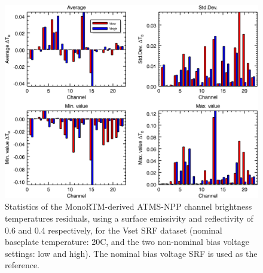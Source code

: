\begin{figure}[H]
  \centering
    \includegraphics[bb=0 0 416 333,clip,scale=0.9]{graphics/dtb/Vset/e0.6_r0.4/stats_ref-nominal.png} 
  \caption{Statistics of the MonoRTM-derived ATMS-NPP channel brightness temperatures residuals, using a surface emissivity and reflectivity of 0.6 and 0.4 respectively, for the Vset SRF dataset (nominal baseplate temperature: 20\textdegree{}C, and the two non-nominal bias voltage settings: low and high). The nominal bias voltage SRF is used as the reference.}
  \label{fig:Vset_e0.6_r0.4_stats_ref-nominal}
\end{figure}



